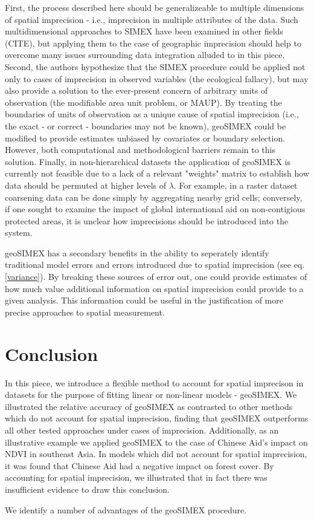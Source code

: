 First, the process described here should be generalizeable to multiple dimensions of spatial imprecision - i.e., imprecision in multiple attributes of the data.
Such multidimensional approaches to SIMEX have been examined in other fields (CITE), but applying them to the case of geographic imprecision should help to overcome many issues surrounding data integration alluded to in this piece.
Second, the authors hypothesize that the SIMEX procedure could be applied not only to cases of imprecision in observed variables (the ecological fallacy), but may also provide a solution to the ever-present concern of arbitrary units of observation (the modifiable area unit problem, or MAUP).
By treating the boundaries of units of observation as a unique cause of spatial imprecision (i.e., the exact - or correct - boundaries may not be known), geoSIMEX could be modified to provide estimates unbiased by covariates or boundary selection.
However, both computational and methodological barriers remain to this solution.
Finally, in non-hierarchical datasets the application of geoSIMEX is currently not feasible due to a lack of a relevant "weights" matrix to establish how data should be permuted at higher levels of $\lambda$.
For example, in a raster dataset coarsening data can be done simply by aggregating nearby grid cells; conversely, if one sought to examine the impact of global international aid on non-contigious protected areas, it is unclear how imprecisions should be introduced into the system.
\par
geoSIMEX has a secondary benefits in the ability to seperately identify traditional model errors and errors introduced due to spatial imprecision (see eq. \ref{variance}).
By breaking these sources of error out, one could provide estimates of how much value additional information on spatial imprecision could provide to a given analysis.
This information could be useful in the justification of more precise approaches to spatial measurement.
\newpage

\section{Conclusion}
In this piece, we introduce a flexible method to account for spatial imprecison in datasets for the purpose of fitting linear or non-linear models - geoSIMEX.
We illustrated the relative accuracy of geoSIMEX as contrasted to other methods which do not account for spatial imprecision, finding that geoSIMEX outperforms all other tested approaches under cases of imprecision.
Additionally, as an illustrative example we applied geoSIMEX to the case of Chinese Aid's impact on NDVI in southeast Asia.  
In models which did not account for spatial imprecision, it was found that Chinese Aid had a negative impact on forest cover.
By accounting for spatial imprecision, we illustrated that in fact there was insufficient evidence to draw this conclusion.
\par
We identify a number of advantages of the geoSIMEX procedure.  


